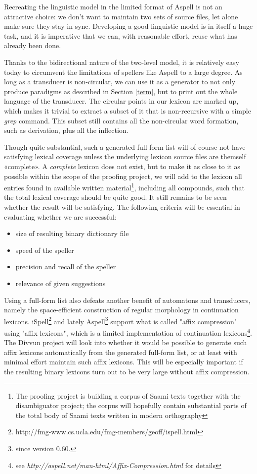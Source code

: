 \documentclass[a4paper,english]{article}
\begin{document}
Recreating the linguistic model in the limited format of Aspell is not an attractive choice: we don't want to maintain two sets of source files, let alone make sure they stay in sync. Developing a good linguistic model is in itself a huge task, and it is imperative that we can, with reasonable effort, reuse what has already been done.

Thanks to the bidirectional nature of the two-level model, it is relatively easy today to circumvent the limitations of spellers like Aspell to a large degree. As long as a transducer  is non-circular, we can use it as a generator to not only produce paradigms as described in Section \ref{term}, but to print out the whole language of the transducer. The circular points in our lexicon are marked up, which makes it trivial to extract a subset of it that is non-recursive with a simple \textit{grep} command. This subset still contains all the non-circular word formation, such as derivation, plus all the inflection.

Though quite substantial, such a generated full-form list will of course not have satisfying lexical coverage unless the underlying lexicon source files are themself «complete». A \textit{complete} lexicon does not exist, but to make it as close to it as possible within the scope of the proofing project, we will add to the lexicon all entries found in available written material\footnote{The proofing project is building a corpus of Saami texts together with the disambiguator project; the corpus will hopefully contain substantial parts of the total body of Saami texts written in modern orthography}, including all compounds, such that the total lexical coverage should be quite good. It still remains to be seen whether the result will be satisfying. The following criteria will be essential in evaluating whether we are successful:

\begin{itemize}
\item size of resulting binary dictionary file
\item speed of the speller
\item precision and recall of the speller
\item relevance of given suggestions
\end{itemize}

Using a full-form list also defeats another benefit of automatons and transducers, namely the space-efficient construction of regular morphology in continuation lexicons. iSpell\footnote{http://fmg-www.cs.ucla.edu/fmg-members/geoff/ispell.html} and lately Aspell\footnote{since version 0.60.} support what is called "affix compression" using "affix lexicons", which is a limited implementation of continuation lexicons\footnote{see \textit{http://aspell.net/man-html/Affix-Compression.html} for details}. The Divvun project will look into whether it would be possible to generate such affix lexicons automatically from the generated full-form list, or at least with minimal effort maintain such affix lexicons. This will be especially important if the resulting binary lexicons turn out to be very large without affix compression.
\end{document}
